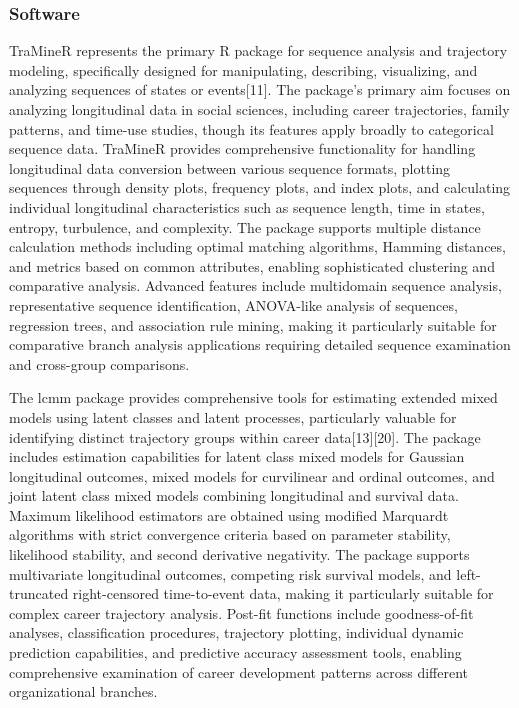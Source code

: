 \documentclass[main.tex]{subfiles}
\begin{document}
\subsubsection{Software}


TraMineR represents the primary R package for sequence analysis and trajectory modeling, specifically designed for manipulating, describing, visualizing, and analyzing sequences of states or events[11]. The package's primary aim focuses on analyzing longitudinal data in social sciences, including career trajectories, family patterns, and time-use studies, though its features apply broadly to categorical sequence data. TraMineR provides comprehensive functionality for handling longitudinal data conversion between various sequence formats, plotting sequences through density plots, frequency plots, and index plots, and calculating individual longitudinal characteristics such as sequence length, time in states, entropy, turbulence, and complexity. The package supports multiple distance calculation methods including optimal matching algorithms, Hamming distances, and metrics based on common attributes, enabling sophisticated clustering and comparative analysis. Advanced features include multidomain sequence analysis, representative sequence identification, ANOVA-like analysis of sequences, regression trees, and association rule mining, making it particularly suitable for comparative branch analysis applications requiring detailed sequence examination and cross-group comparisons.


The lcmm package provides comprehensive tools for estimating extended mixed models using latent classes and latent processes, particularly valuable for identifying distinct trajectory groups within career data[13][20]. The package includes estimation capabilities for latent class mixed models for Gaussian longitudinal outcomes, mixed models for curvilinear and ordinal outcomes, and joint latent class mixed models combining longitudinal and survival data. Maximum likelihood estimators are obtained using modified Marquardt algorithms with strict convergence criteria based on parameter stability, likelihood stability, and second derivative negativity. The package supports multivariate longitudinal outcomes, competing risk survival models, and left-truncated right-censored time-to-event data, making it particularly suitable for complex career trajectory analysis. Post-fit functions include goodness-of-fit analyses, classification procedures, trajectory plotting, individual dynamic prediction capabilities, and predictive accuracy assessment tools, enabling comprehensive examination of career development patterns across different organizational branches.
\end{document}
